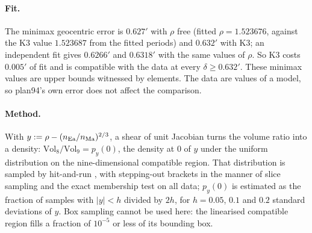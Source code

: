 \paragraph{Fit.} The minimax geocentric error is $0.627'$ with $\rho$ free (fitted $\rho=1.523676$, against the $\mathrm{K3}$ value $1.523687$ from the fitted periods) and $0.632'$ with $\mathrm{K3}$; an independent fit gives $0.6266'$ and $0.6318'$ with the same values of $\rho$. So $\mathrm{K3}$ costs $0.005'$ of fit and is compatible with the data at every $\delta\ge0.632'$. These minimax values are upper bounds witnessed by elements. The data are values of a model, so plan94's own error does not affect the comparison.

\paragraph{Method.} With $y:=\rho-(n_{\rm Ea}/n_{\rm Ma})^{2/3}$, a shear of unit Jacobian turns the volume ratio into a density: $\mathrm{Vol}_8/\mathrm{Vol}_9=p_y(0)$, the density at $0$ of $y$ under the uniform distribution on the nine-dimensional compatible region. That distribution is sampled by hit-and-run \citep{smith1984efficient}, with stepping-out brackets in the manner of slice sampling \citep{neal2003slice} and the exact membership test on all data; $p_y(0)$ is estimated as the fraction of samples with $\lvert y\rvert<h$ divided by $2h$, for $h=0.05$, $0.1$ and $0.2$ standard deviations of $y$. Box sampling cannot be used here: the linearised compatible region fills a fraction of $10^{-5}$ or less of its bounding box.

